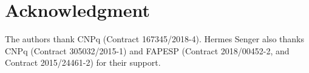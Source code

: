 \documentclass[conference]{IEEEtran}
\begin{document}
\section*{Acknowledgment}

The authors thank CNPq (Contract 167345/2018-4).
Hermes Senger also thanks CNPq (Contract 305032/2015-1) and FAPESP (Contract
2018/00452-2, and Contract 2015/24461-2) for their support.

% 


\end{document}
